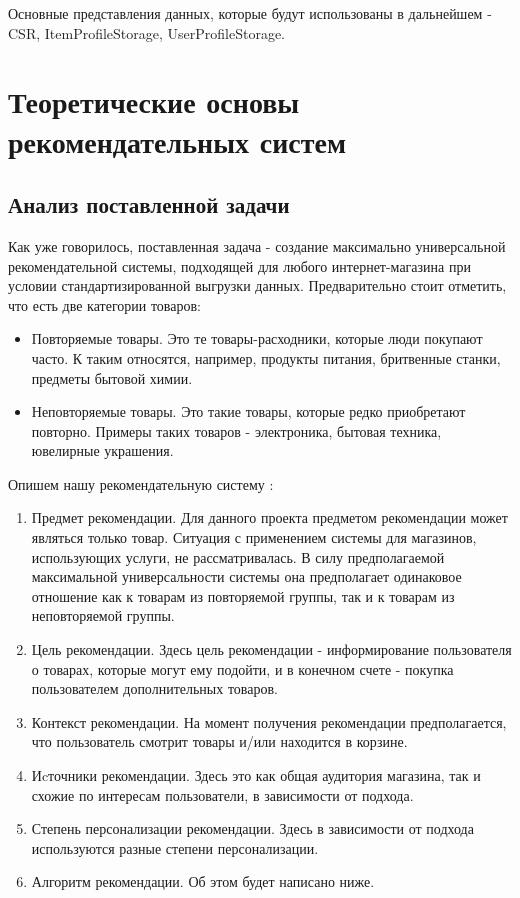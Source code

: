 \documentclass[14pt]{mmcs_article}
\begin{document}
Основные представления данных, которые будут использованы в дальнейшем - CSR, ItemProfileStorage, UserProfileStorage.


\section{Теоретические основы рекомендательных систем}\label{dsfs}
\subsection{Анализ поставленной задачи}
Как уже говорилось, поставленная задача - создание максимально универсальной рекомендательной системы, подходящей для любого интернет-магазина при условии стандартизированной выгрузки данных.
Предварительно стоит отметить, что есть две категории товаров:
\begin{itemize}
	\item Повторяемые товары. Это те товары-расходники, которые люди покупают часто. К таким относятся, например, продукты питания, бритвенные станки, предметы бытовой химии.
	\item  Неповторяемые товары. Это такие товары, которые редко приобретают повторно. Примеры таких товаров - электроника, бытовая техника, ювелирные украшения.
\end{itemize}
Опишем нашу рекомендательную систему \cite{stud:kimfalk1}:
\begin{enumerate}
\item Предмет рекомендации. Для данного проекта предметом рекомендации может являться только товар. Ситуация с применением системы для магазинов, использующих услуги, не рассматривалась. В силу предполагаемой максимальной универсальности системы она предполагает одинаковое отношение как к товарам из повторяемой группы, так и к товарам из неповторяемой группы.
\item Цель рекомендации. Здесь цель рекомендации - информирование пользователя о товарах, которые могут ему подойти, и в конечном счете - покупка пользователем дополнительных товаров.
\item Контекст рекомендации. На момент получения рекомендации предполагается, что пользователь смотрит товары и/или находится в корзине.
\item Иcточники рекомендации. Здесь это как общая аудитория магазина, так и схожие по интересам пользователи, в зависимости от подхода.
\item Степень персонализации рекомендации. Здесь в зависимости от подхода используются разные степени персонализации.
\item Алгоритм рекомендации. Об этом будет написано ниже. 
\end{enumerate}
\end{document}
